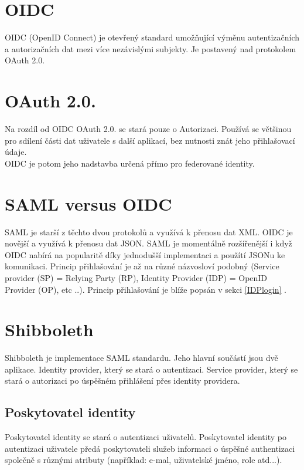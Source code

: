 \section{OIDC}

OIDC (OpenID Connect) je otevřený standard umožňující výměnu autentizačních a autorizačních dat mezi více nezávislými subjekty. Je postavený nad protokolem OAuth 2.0.\cite{OIDC}

\section{OAuth 2.0.}
Na rozdíl od OIDC OAuth 2.0. se stará pouze o Autorizaci. Používá se většinou pro sdílení části dat uživatele s další aplikací, bez nutnosti znát jeho přihlašovací údaje. \\
OIDC je potom jeho nadstavba určená přímo pro federované identity. \cite{OAUTHvSAMLvOIDC}

\section{SAML versus OIDC}

SAML je starší z těchto dvou protokolů a využívá k přenosu dat XML. OIDC je novější a využívá k přenosu dat JSON. 
SAML je momentálně rozšířenější i když OIDC nabírá na popularitě díky jednodušší implementaci a použítí JSONu ke komunikaci.\cite{SAMLxOIDC}
Princip přihlašování je až na různé názvosloví podobný (Service provider (SP) = Relying Party (RP),  Identity Provider (IDP) = OpenID Provider (OP), etc ..).
Princip přihlašování je blíže popsán v sekci \ref{IDPlogin} .

\section{Shibboleth}

Shibboleth je implementace SAML standardu. Jeho hlavní součástí jsou dvě aplikace. Identity provider, který se stará o autentizaci. Service provider, který se stará o autorizaci po úspěšném přihlášení přes identity providera. \cite{shibbolethWiki}

\subsection{Poskytovatel identity}

Poskytovatel identity se stará o autentizaci uživatelů. Poskytovatel identity po autentizaci uživatele předá poskytovateli služeb informaci o úspěšné authentizaci společně s různými atributy (například: e-mal, uživatelské jméno, role atd...).

